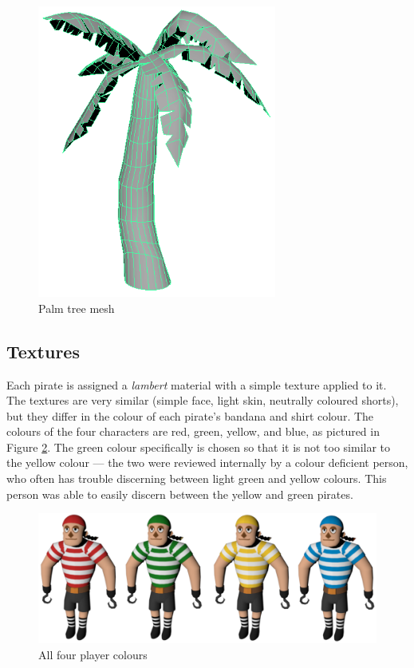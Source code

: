 \begin{figure}[h!]
	\centering
	\includegraphics[width=0.7\textwidth]{figures/palmtree_mesh.png}
	\caption{Palm tree mesh \label{fig:palmtree_mesh}}
\end{figure}

\subsection{Textures}
Each pirate is assigned a \textit{lambert} material with a simple texture applied to it. The textures are very similar (simple face, light skin, neutrally coloured shorts), but they differ in the colour of each pirate's bandana and shirt colour. The colours of the four characters are red, green, yellow, and blue, as pictured in Figure \ref{fig:pirate_rainbow}. The green colour specifically is chosen so that it is not too similar to the yellow colour --- the two were reviewed internally by a colour deficient person, who often has trouble discerning between light green and yellow colours. This person was able to easily discern between the yellow and green pirates.

\begin{figure}[h!]
	\centering
	\includegraphics[width=\textwidth]{figures/pirate_rainbow.png}
	\caption{All four player colours \label{fig:pirate_rainbow}}
\end{figure}


